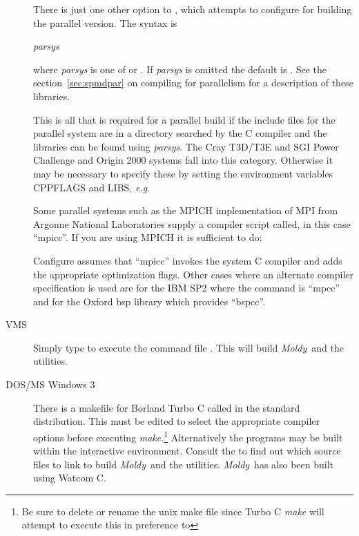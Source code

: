 \documentclass[a4paper,twoside]{report}
\newcommand{\moldy}{\emph{Moldy}}
\newcommand{\eg}{\emph{e.g.}}
\begin{document}
\begin{description}
There is just one other option to ,
 which attempts to configure for building the
parallel version.  The syntax is

\textit{parsys}

where \textit{parsys} is one of    or
.  If \textit{parsys} is omitted the default is .
See the section~\ref{sec:spmdpar} on compiling for parallelism for a
description of these libraries.

This is all that is required for a parallel build if the include files
for the parallel system are in a directory searched by the C compiler
and the libraries can be found using \textit{parsys}.  The
Cray T3D/T3E and SGI Power Challenge and Origin 2000 systems fall into
this category.  Otherwise it may be necessary to specify these by
setting the environment variables CPPFLAGS and LIBS, \eg\:


Some parallel systems such as the MPICH implementation of MPI
from Argonne National Laboratories supply a compiler script
called, in this case ``mpicc''.  If you are using MPICH it is
sufficient to do:


Configure assumes that ``mpicc'' invokes the system C compiler
and adds the appropriate optimization flags.  Other cases where
an alternate compiler specification is used are for the IBM SP2
where the command is ``mpcc'' and for the Oxford bsp library
which provides ``bspcc''.

\item[VMS]  Simply type  to execute the command file
. This will build \moldy\  and the utilities.

\item[DOS/MS Windows 3] There is a makefile for Borland Turbo C called
   in the standard distribution.  This must be
  edited to select the appropriate compiler options before executing
  \emph{make}.\footnote{Be sure to delete or rename the unix make file
     since Turbo C \emph{make} will attempt to
    execute this in preference to }
  Alternatively the programs may be built within the interactive
  environment.  Consult the  to find out which source
  files to link to build \moldy\ and the utilities.  \moldy\ has also
  been built using Watcom C.
  

\end{description}
\end{document}
